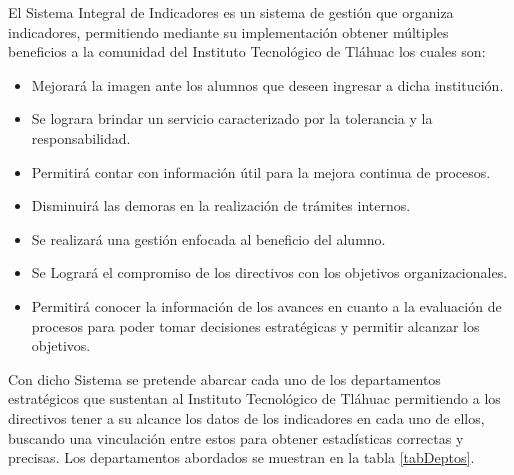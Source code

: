 	El Sistema Integral de Indicadores es un sistema de gesti\'on que organiza indicadores, permitiendo mediante su implementaci\'on obtener m\'ultiples beneficios a la comunidad del Instituto Tecnol\'ogico de Tl\'ahuac los cuales son:
	\begin{itemize}
		\item Mejorar\'a la imagen ante los alumnos que deseen ingresar a dicha instituci\'on.
		\item Se lograra brindar un servicio caracterizado por la tolerancia y la responsabilidad.
		\item Permitir\'a contar con informaci\'on \'util para la mejora continua de procesos.
		\item Disminuir\'a las demoras en la realizaci\'on de tr\'amites internos.
		\item Se realizar\'a una gesti\'on enfocada al beneficio del alumno.
		\item Se Lograr\'a el compromiso de los directivos con los objetivos organizacionales.
		\item Permitir\'a conocer la informaci\'on de los avances en cuanto a la evaluaci\'on de procesos para poder tomar decisiones  estrat\'egicas y permitir alcanzar los objetivos.
	\end{itemize}

	Con dicho Sistema se pretende abarcar cada uno de los departamentos estrat\'egicos que sustentan al Instituto Tecnol\'ogico de Tl\'ahuac permitiendo a los directivos tener a su alcance los datos de los indicadores en cada uno de ellos, buscando una vinculaci\'on entre estos para obtener estad\'isticas correctas y precisas. Los departamentos abordados se muestran en la tabla \ref{tabDeptos}.

